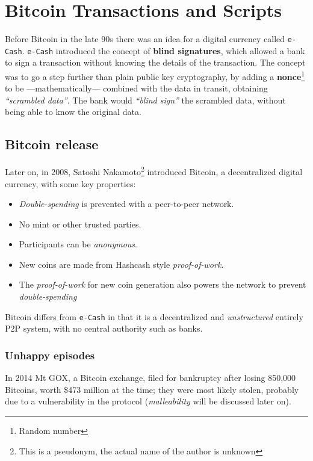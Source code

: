 \chapter{Bitcoin Transactions and Scripts}

Before Bitcoin in the late 90s there was an idea for a digital currency called \texttt{e-Cash}.
\texttt{e-Cash} introduced the concept of \textbf{blind signatures}, which allowed a bank to sign a transaction without knowing the details of the transaction.
The concept was to go a step further than plain public key cryptography, by adding a \textbf{nonce}\footnote{Random number} to be ---mathematically--- combined with the data in transit, obtaining \textit{``scrambled data''}.
The bank would \textit{``blind sign''} the scrambled data, without being able to know the original data.

\section{Bitcoin release}

Later on, in 2008, Satoshi Nakamoto\footnote{This is a pseudonym, the actual name of the author is unknown} introduced Bitcoin, a decentralized digital currency, with some key properties:
\begin{itemize}
   \item \textit{Double-spending} is prevented with a peer-to-peer network.
   \item No mint or other trusted parties.
   \item Participants can be \textit{anonymous}.
   \item New coins are made from Hashcash style \textit{proof-of-work}.
   \item The \textit{proof-of-work} for new coin generation also powers the network to prevent \textit{double-spending}
\end{itemize}

Bitcoin differs from \texttt{e-Cash} in that it is a decentralized and \textit{unstructured} entirely P2P system, with no central authority such as banks.

\subsection{Unhappy episodes}
In 2014 Mt GOX, a Bitcoin exchange, filed for bankruptcy after losing 850,000 Bitcoins, worth \$473 million at the time; they were most likely stolen, probably due to a vulnerability in the protocol (\textit{malleability} will be discussed later on).

